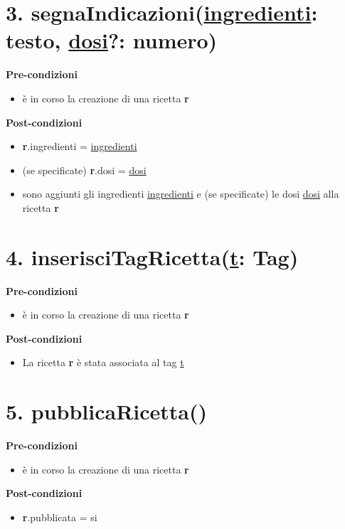 \documentclass[12pt]{extarticle}
\begin{document}
\section*{3. segnaIndicazioni(\underline{ingredienti}: testo, \underline{dosi}?: numero)}

\textbf{Pre-condizioni}
\begin{itemize}
  \item è in corso la creazione di una ricetta  \textbf{r}
\end{itemize}
\textbf{Post-condizioni}
\begin{itemize}
    \item \textbf{r}.ingredienti = \underline{ingredienti}
    \item (se specificate) \textbf{r}.dosi = \underline{dosi}
    \item sono aggiunti gli ingredienti \underline{ingredienti} e (se specificate) le dosi  \underline{dosi} alla ricetta \textbf{r}
\end{itemize}



\section*{4. inserisciTagRicetta(\underline{t}: Tag)}

\textbf{Pre-condizioni}
\begin{itemize}
  \item è in corso la creazione di una ricetta  \textbf{r}
\end{itemize}
\textbf{Post-condizioni}
\begin{itemize}
  \item La ricetta  \textbf{r} è stata associata al tag \underline{t} 
\end{itemize}

\section*{5. pubblicaRicetta()}

\textbf{Pre-condizioni}
\begin{itemize}
  \item è in corso la creazione di una ricetta  \textbf{r}
\end{itemize}
\textbf{Post-condizioni}
\begin{itemize}
  \item \textbf{r}.pubblicata = si
\end{itemize}
\end{document}
